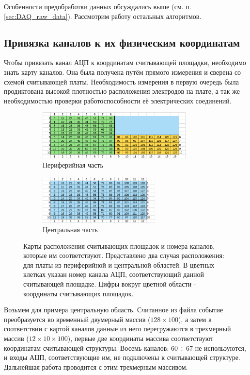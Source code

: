 Особенности предобработки данных обсуждались выше (см. п. \ref{sec:DAQ_raw_data}). Рассмотрим работу остальных алгоритмов.
\subsection{Привязка каналов к их физическим координатам}
Чтобы привязать канал АЦП к координатам считывающей площадки, необходимо знать карту каналов. Она была получена путём прямого измерения и сверена со схемой считывающей платы. Необходимость измерения в первую очередь была продиктована высокой плотностью расположения электродов на плате, а так же необходимостью проверки работоспособности её электрических соединений. 
\begin{figure}[H]
	\centering
	\begin{subfigure}{.5\textwidth}
		\centering
		\includegraphics[height = 2.5cm]{img/Side_pixmap.png}
		\caption{Периферийная часть}
	\end{subfigure}%
	\begin{subfigure}{.5\textwidth}
		\centering
		\includegraphics[height=2.5cm]{img/Center_pixmap.png}
		\caption{Центральная часть}
	\end{subfigure}
	\caption{Карты расположения считывающих площадок и номера каналов, которые им соответствуют. Представлено два случая расположения: для платы из периферийной и центральной областей. В цветных клетках указан номер канала АЦП, соответствующий данной считывающей площадке. Цифры вокруг цветной области - координаты считывающих площадок.}
	\label{fig:pixmap}
\end{figure}
Возьмем для примера центральную область. Считанное из файла событие преобразуется во временный двумерный массив ($128\times100$), а затем в соответствии с картой каналов данные из него перегружаются в трехмерный массив ($12\times10\times100$), первые две координаты массива соответствуют координатам считывающей структуры. Восемь каналов: $60\div67$ не используются, и входы АЦП, соответствующие им, не подключены к считывающей структуре. Дальнейшая работа проводится с этим трехмерным массивом.
